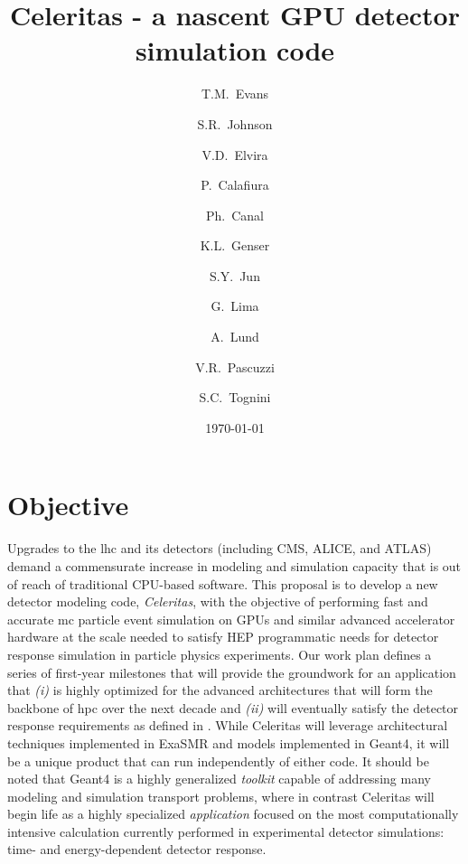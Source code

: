 \documentclass[10pt]{article}
\author[1]{T.M.~Evans}
\author[1]{S.R.~Johnson}
\author[2]{V.D.~Elvira}
\author[3]{P.~Calafiura}
\author[2]{Ph.~Canal}
\author[2]{K.L.~Genser}
\author[2]{S.Y.~Jun}
\author[2]{G.~Lima}
\author[4]{A.~Lund}
\author[3]{V.R.~Pascuzzi}
\author[1]{S.C.~Tognini}
\affil[1]{Oak Ridge National Laboratory}
\affil[2]{Fermi National Accelerator Laboratory}
\affil[3]{Lawrence Berkeley National Laboratory}
\affil[4]{Argonne National Laboratory}
\title{Celeritas - a nascent GPU detector simulation code}
\date{\today}
\begin{document}
\maketitle

\section*{Objective}

Upgrades to the \ac{lhc} and its detectors (including CMS, ALICE, and
ATLAS) demand a commensurate increase in modeling and simulation
capacity that is out of reach of traditional CPU-based software.
This proposal is to develop a new detector modeling code, \emph{Celeritas},
with the objective of performing fast and accurate \ac{mc} particle event
simulation on GPUs
and similar advanced accelerator hardware at the scale needed to satisfy HEP
programmatic needs for detector response simulation in particle physics
experiments. Our work plan defines a series of first-year milestones that will
provide the groundwork for an application that \textsl{(i)} is highly optimized
for the advanced architectures that will form the backbone of \ac{hpc}
over the next decade and \textsl{(ii)} will eventually satisfy the detector
response requirements as
defined in  \cite{the_hep_software_foundation_roadmap_2019}. While Celeritas will
leverage architectural techniques implemented in ExaSMR and models implemented
in Geant4, it will be a unique product that can run independently of either
code.
It should be noted that Geant4 is a
highly generalized \emph{toolkit} capable of addressing many modeling and
simulation transport problems, where in contrast
Celeritas will begin life as a highly specialized \emph{application} focused on
the most computationally intensive calculation currently performed in
experimental detector simulations: time- and energy-dependent detector response.


\end{document}
